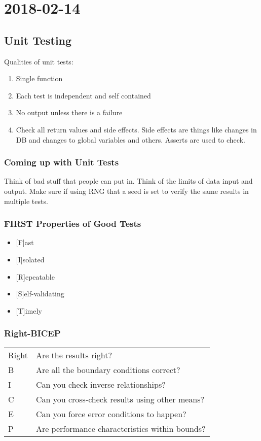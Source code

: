 \documentclass{report}
\newcommand{\mychapter}[2]{
	\setcounter{chapter}{#1}
	\setcounter{section}{0}
	\chapter*{#2}
	\addcontentsline{toc}{chapter}{#2}
}
\begin{document}
 
\tableofcontents{}
\mychapter{1}{2018-02-14}
\section{Unit Testing}
Qualities of unit tests:
\begin{enumerate}
\item Single function
\item Each test is independent and self contained
\item No output unless there is a failure
\item Check all return values and side effects. Side effects are things like changes in DB and changes to global variables and others. Asserts are used to check.
\end{enumerate}
\subsection{Coming up with Unit Tests}
Think of bad stuff that people can put in. Think of the limits of data input and output. Make sure if using RNG that a seed is set to verify the same results in multiple tests.

\subsection{FIRST Properties of Good Tests}
\begin{itemize}
\item {[}F{]}ast
\item {[}I{]}solated
\item {[}R{]}epeatable
\item {[}S{]}elf-validating
\item {[}T{]}imely
\end{itemize}

\subsection{Right-BICEP}
\begin{tabular}{ll}
Right & Are the results right?\\
B & Are all the boundary conditions correct?\\
I & Can you check inverse relationships?\\
C & Can you cross-check results using other means?\\
E & Can you force error conditions to happen?\\
P & Are performance characteristics within bounds?\\
\end{tabular}
\end{document}
